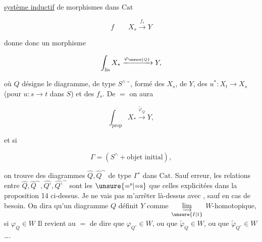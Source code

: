 \uline{système inductif} de morphismes dans $\mathrm{Cat}$

\[
f\qquad X_s\xrightarrow{f_s}Y
\]

donne donc un morphisme

\[
\int_{\mathrm{lis}}X_*\xrightarrow{\varphi_{\unsure{Q}}}Y,
\]

où $Q$ désigne le diagramme, de type $S^{\wedge\,\circ}$, formé des $X_s$, de $Y$, des $u^*:X_t\to X_s$ (pour $u:s\to t$ dans $S$) et des $f_s$. De $=$ on aura

\[
\int_{\mathrm{prop}}X_*\xrightarrow{\widetilde\varphi_Q}Y,
\]

et si

\[
\Gamma=(S^\wedge+\text{objet initial}),
\]

on trouve des diagrammes $\widehat Q,\widehat Q^{\sim}$ de type $\Gamma^\circ$ dans $\mathrm{Cat}$. Sauf erreur, les relations entre $\widehat Q,\widehat Q^{\sim},\widehat{Q^\circ},\widehat{Q^\circ}^{\sim}$ sont les $\unsure{{=}^{\mathrm s}|{=}\mathrm s}$ que celles explicitées dans la proposition 14 ci-dessus. Je ne vais pas m'arrêter là-dessus avec , sauf en cas de besoin. On dira qu'un diagramme $Q$ définit $Y$ comme $\underset{\unsure{I|1}}{\varinjlim}$ $W$-homotopique, si $\varphi_Q\in W$ Il revient au $=$ de dire que $\varphi_{Q^\circ}\in W$, ou que $\widetilde\varphi_Q\in W$, ou que $\widetilde\varphi_{Q^\circ}\in W$\ldots.
